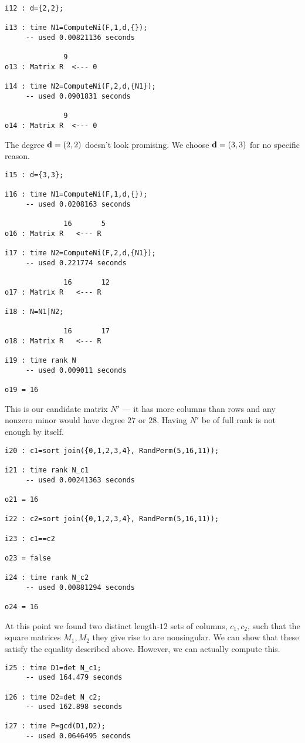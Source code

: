 \documentclass[fleqn,reqno]{amsart}
\begin{document}
\begin{example}[$\mt{ex604}$]
\begin{verbatim}
i12 : d={2,2};

i13 : time N1=ComputeNi(F,1,d,{});
     -- used 0.00821136 seconds

              9
o13 : Matrix R  <--- 0

i14 : time N2=ComputeNi(F,2,d,{N1});
     -- used 0.0901831 seconds

              9
o14 : Matrix R  <--- 0
\end{verbatim}
The degree $\mathbf d=(2,2)$ doesn't look promising.
We choose $\mathbf d=(3,3)$ for no specific reason.
\begin{verbatim}
i15 : d={3,3};

i16 : time N1=ComputeNi(F,1,d,{});
     -- used 0.0208163 seconds

              16       5
o16 : Matrix R   <--- R

i17 : time N2=ComputeNi(F,2,d,{N1});
     -- used 0.221774 seconds

              16       12
o17 : Matrix R   <--- R

i18 : N=N1|N2;

              16       17
o18 : Matrix R   <--- R

i19 : time rank N
     -- used 0.009011 seconds

o19 = 16
\end{verbatim}
This is our candidate matrix $N'$ --- it has more columns than rows and any
nonzero minor would have degree $27$ or $28$.
Having $N'$ be of full rank is not enough by itself.
\begin{verbatim}
i20 : c1=sort join({0,1,2,3,4}, RandPerm(5,16,11));

i21 : time rank N_c1
     -- used 0.00241363 seconds

o21 = 16

i22 : c2=sort join({0,1,2,3,4}, RandPerm(5,16,11));

i23 : c1==c2

o23 = false

i24 : time rank N_c2
     -- used 0.00881294 seconds

o24 = 16
\end{verbatim}
At this point we found two distinct length-$12$ sets of columns, $c_1,c_2$,
such that the square matrices $M_1,M_2$ they give rise to are nonsingular.
We can show that these satisfy the equality described above.
However, we can actually compute this.
\begin{verbatim}
i25 : time D1=det N_c1;
     -- used 164.479 seconds

i26 : time D2=det N_c2;
     -- used 162.898 seconds

i27 : time P=gcd(D1,D2);
     -- used 0.0646495 seconds
\end{verbatim}
\end{example}
\end{document}
